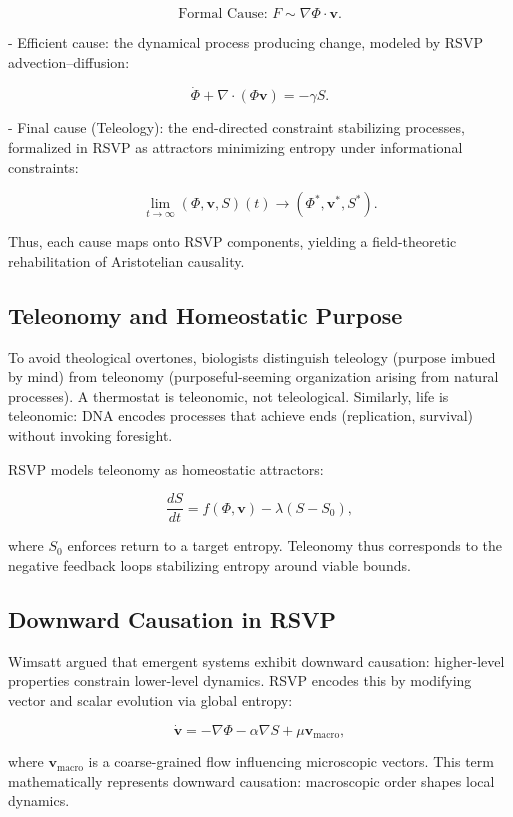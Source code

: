 \documentclass[12pt]{book}
\begin{document}
  \[ \text{Formal Cause: } F \sim \nabla \Phi \cdot \mathbf{v}. \]

- Efficient cause: the dynamical process producing change, modeled by RSVP advection–diffusion:

  \[ \dot{\Phi} + \nabla \cdot (\Phi \mathbf{v}) = -\gamma S. \]

- Final cause (Teleology): the end-directed constraint stabilizing processes, formalized in RSVP as attractors minimizing entropy under informational constraints:

  \[ \lim_{t\to\infty} (\Phi, \mathbf{v}, S)(t) \to (\Phi^*, \mathbf{v}^*, S^*). \]

Thus, each cause maps onto RSVP components, yielding a field-theoretic rehabilitation of Aristotelian causality.

\subsection{Teleonomy and Homeostatic Purpose}
To avoid theological overtones, biologists distinguish teleology (purpose imbued by mind) from teleonomy (purposeful-seeming organization arising from natural processes). A thermostat is teleonomic, not teleological. Similarly, life is teleonomic: DNA encodes processes that achieve ends (replication, survival) without invoking foresight.

RSVP models teleonomy as homeostatic attractors:

\[ \frac{dS}{dt} = f(\Phi, \mathbf{v}) - \lambda (S - S_0), \]

where \( S_0 \) enforces return to a target entropy. Teleonomy thus corresponds to the negative feedback loops stabilizing entropy around viable bounds.

\subsection{Downward Causation in RSVP}
Wimsatt argued that emergent systems exhibit downward causation: higher-level properties constrain lower-level dynamics. RSVP encodes this by modifying vector and scalar evolution via global entropy:

\[ \dot{\mathbf{v}} = -\nabla \Phi - \alpha \nabla S + \mu \mathbf{v}_{\text{macro}}, \]

where \( \mathbf{v}_{\text{macro}} \) is a coarse-grained flow influencing microscopic vectors. This term mathematically represents downward causation: macroscopic order shapes local dynamics.
\end{document}

